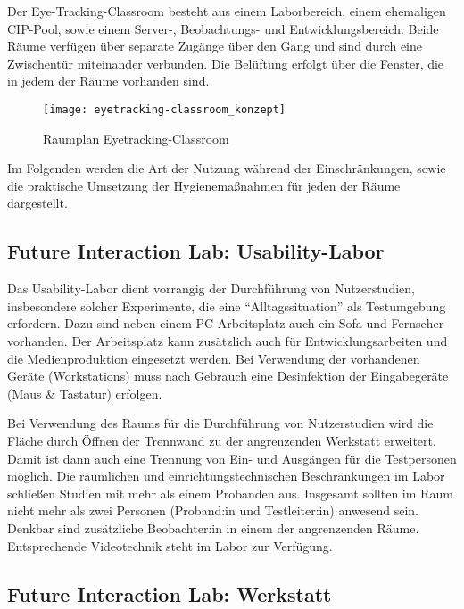 \medskip
\noindent
Der Eye-Tracking-Classroom besteht aus einem Laborbereich, einem ehemaligen CIP-Pool, sowie einem Server-, Beobachtungs- und Entwicklungsbereich. Beide Räume verfügen über separate Zugänge über den Gang und sind durch eine Zwischentür miteinander verbunden.
Die Belüftung erfolgt über die Fenster, die in jedem der Räume vorhanden sind.

\medskip
\begin{figure}[h]
    \label{fig:raumplan_eyetracking}
    \centering
    \texttt{[image: eyetracking-classroom\_konzept]}
    \caption{Raumplan Eyetracking-Classroom}
\end{figure}

\medskip
\noindent
Im Folgenden werden die Art der Nutzung während der Einschränkungen, sowie die praktische Umsetzung der Hygienemaßnahmen für jeden der Räume dargestellt.

\subsection{Future Interaction Lab: Usability-Labor}\label{subsec:labore_fil_labor}


\noindent
Das Usability-Labor dient vorrangig der Durchführung von Nutzerstudien, insbesondere solcher Experimente, die eine ``Alltagssituation'' als Testumgebung erfordern. Dazu sind neben einem PC-Arbeitsplatz auch ein Sofa und Fernseher vorhanden.
Der Arbeitsplatz kann zusätzlich auch für Entwicklungsarbeiten und die Medienproduktion eingesetzt werden.
Bei Verwendung der vorhandenen Geräte (Workstations) muss nach Gebrauch eine Desinfektion der Eingabegeräte (Maus \& Tastatur) erfolgen.

\medskip
\noindent
Bei Verwendung des Raums für die Durchführung von Nutzerstudien wird die Fläche  durch Öffnen der Trennwand zu der angrenzenden Werkstatt erweitert. Damit ist dann auch eine Trennung von Ein- und Ausgängen für die Testpersonen möglich.
Die räumlichen und einrichtungstechnischen  Beschränkungen im Labor schließen Studien mit mehr als einem Probanden aus.
Insgesamt sollten im Raum nicht mehr als zwei Personen (Proband:in und Testleiter:in) anwesend sein. Denkbar sind zusätzliche Beobachter:in in einem der angrenzenden Räume. Entsprechende Videotechnik steht im Labor zur Verfügung.

\subsection{Future Interaction Lab: Werkstatt}\label{subsec:labore_fil_werkstatt}


